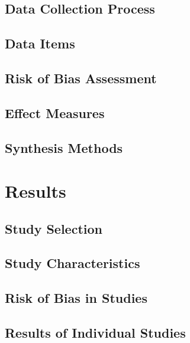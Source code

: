 \documentclass[12pt]{article}
\begin{document}
\subsection{Data Collection Process}

\subsection{Data Items}

\subsection{Risk of Bias Assessment}

\subsection{Effect Measures}

\subsection{Synthesis Methods}

\section{Results}

\subsection{Study Selection}

\subsection{Study Characteristics}

\subsection{Risk of Bias in Studies}

\subsection{Results of Individual Studies}
\end{document}
